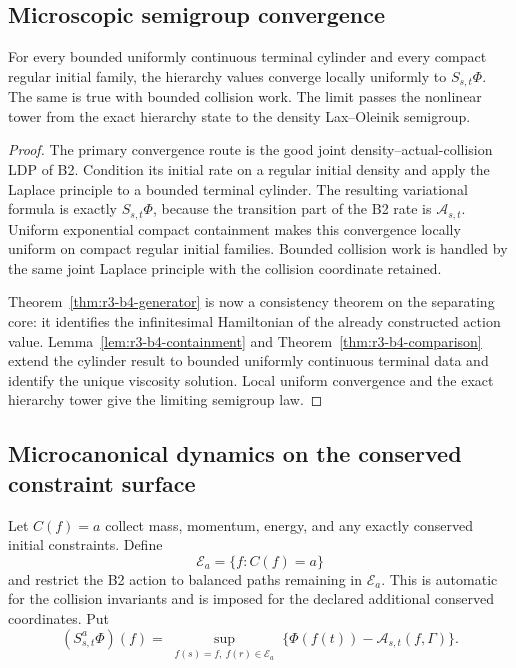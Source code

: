 \subsection{Microscopic semigroup convergence}

\begin{theorem}
\label{thm:r3-b4-limit}
For every bounded uniformly continuous terminal cylinder and every compact
regular initial family, the hierarchy values converge locally uniformly to
\(S_{s,t}\Phi\).  The same is true with bounded collision work.  The limit
passes the nonlinear tower from the exact hierarchy state to the density
Lax--Oleinik semigroup.
\end{theorem}

\begin{proof}
The primary convergence route is the good joint density--actual-collision LDP
of B2.  Condition its initial rate on a regular initial density and apply the
Laplace principle to a bounded terminal cylinder.  The resulting variational
formula is exactly \(S_{s,t}\Phi\), because the transition part of the B2 rate
is \(\mathcal A_{s,t}\).  Uniform exponential compact containment makes this
convergence locally uniform on compact regular initial families.  Bounded
collision work is handled by the same joint Laplace principle with the
collision coordinate retained.

Theorem~\ref{thm:r3-b4-generator} is now a consistency theorem on the
separating core: it identifies the infinitesimal Hamiltonian of the already
constructed action value.  Lemma~\ref{lem:r3-b4-containment} and
Theorem~\ref{thm:r3-b4-comparison} extend the cylinder result to bounded
uniformly continuous terminal data and identify the unique viscosity
solution.  Local uniform convergence and the exact hierarchy tower give the
limiting semigroup law.
\end{proof}

\subsection{Microcanonical dynamics on the conserved constraint surface}

Let \(C(f)=a\) collect mass, momentum, energy, and any exactly conserved
initial constraints.  Define
\[
 \mathcal E_a=\{f:C(f)=a\}
\]
and restrict the B2 action to balanced paths remaining in \(\mathcal E_a\).
This is automatic for the collision invariants and is imposed for the declared
additional conserved coordinates.  Put
\[
 (S_{s,t}^a\Phi)(f)
 =\sup_{\substack{f(s)=f,\ f(r)\in\mathcal E_a}}
 \{\Phi(f(t))-\mathcal A_{s,t}(f,\Gamma)\}.
\]

